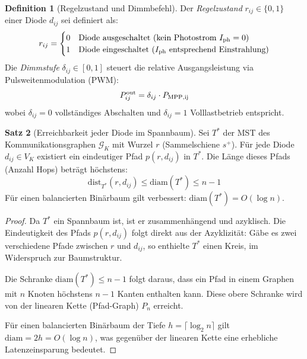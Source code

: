 ﻿\documentclass[a4paper,12pt]{article}
\theoremstyle{definition}
\newtheorem{definition}{Definition}[section]
\newtheorem{satz}[definition]{Satz}
\theoremstyle{remark}
\begin{document}
\begin{definition}[Regelzustand und Dimmbefehl]
\label{def:regelzustand}
Der \emph{Regelzustand} $r_{ij} \in \{0,1\}$ einer Diode $d_{ij}$ sei definiert als:
\begin{equation}
  r_{ij} = \begin{cases}
    0 & \text{Diode ausgeschaltet (kein Photostrom $I_{\rm ph} = 0$)} \\
    1 & \text{Diode eingeschaltet ($I_{\rm ph}$ entsprechend Einstrahlung)}
  \end{cases}
  \label{eq:regelzustand}
\end{equation}
Die \emph{Dimmstufe} $\delta_{ij} \in [0,1]$ steuert die relative Ausgangsleistung
via Pulsweitenmodulation (PWM):
\begin{equation}
  P_{ij}^{\rm out} = \delta_{ij} \cdot P_{\rm MPP,ij}
  \label{eq:dimmformel}
\end{equation}
wobei $\delta_{ij} = 0$ vollständiges Abschalten und $\delta_{ij} = 1$
Volllastbetrieb entspricht.
\end{definition}

\begin{satz}[Erreichbarkeit jeder Diode im Spannbaum]
\label{satz:erreichbarkeit}
Sei $T^*$ der MST des Kommunikationsgraphen $\mathcal{G}_K$ mit Wurzel $r$
(Sammelschiene $s^+$). Für jede Diode $d_{ij} \in V_K$ existiert ein
eindeutiger Pfad $p(r, d_{ij})$ in $T^*$. Die Länge dieses Pfads
(Anzahl Hops) beträgt höchstens:
\begin{equation}
  \mathrm{dist}_{T^*}(r, d_{ij}) \leq \mathrm{diam}(T^*) \leq n - 1
  \label{eq:erreichbarkeit}
\end{equation}
Für einen balancierten Binärbaum gilt verbessert:
$\mathrm{diam}(T^*) = O(\log n)$.
\end{satz}

\begin{proof}
Da $T^*$ ein Spannbaum ist, ist er zusammenhängend und azyklisch.
Die Eindeutigkeit des Pfads $p(r, d_{ij})$ folgt direkt aus der
Azyklizität: Gäbe es zwei verschiedene Pfade zwischen $r$ und $d_{ij}$,
so enthielte $T^*$ einen Kreis, im Widerspruch zur Baumstruktur.

Die Schranke $\mathrm{diam}(T^*) \leq n - 1$ folgt daraus, dass ein Pfad
in einem Graphen mit $n$ Knoten höchstens $n-1$ Kanten enthalten kann.
Diese obere Schranke wird von der linearen Kette (Pfad-Graph) $P_n$ erreicht.

Für einen balancierten Binärbaum der Tiefe $h = \lceil \log_2 n \rceil$ gilt
$\mathrm{diam} = 2h = O(\log n)$, was gegenüber der linearen Kette eine
erhebliche Latenzeinsparung bedeutet.
\end{proof}
\end{document}
